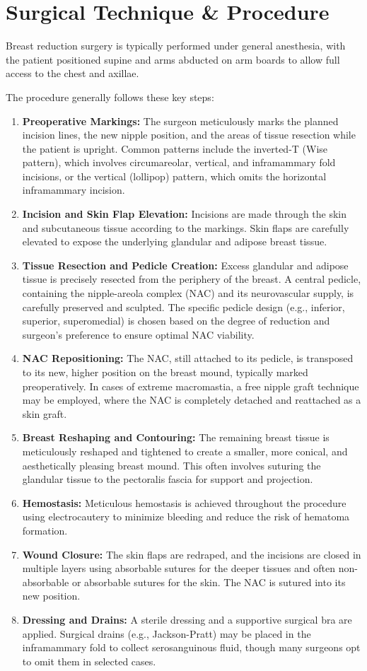 \section*{Surgical Technique \& Procedure}
Breast reduction surgery is typically performed under general anesthesia, with the patient positioned supine and arms abducted on arm boards to allow full access to the chest and axillae.

The procedure generally follows these key steps:
\begin{enumerate}
  \item \textbf{Preoperative Markings:} The surgeon meticulously marks the planned incision lines, the new nipple position, and the areas of tissue resection while the patient is upright. Common patterns include the inverted-T (Wise pattern), which involves circumareolar, vertical, and inframammary fold incisions, or the vertical (lollipop) pattern, which omits the horizontal inframammary incision.
  \item \textbf{Incision and Skin Flap Elevation:} Incisions are made through the skin and subcutaneous tissue according to the markings. Skin flaps are carefully elevated to expose the underlying glandular and adipose breast tissue.
  \item \textbf{Tissue Resection and Pedicle Creation:} Excess glandular and adipose tissue is precisely resected from the periphery of the breast. A central pedicle, containing the nipple-areola complex (NAC) and its neurovascular supply, is carefully preserved and sculpted. The specific pedicle design (e.g., inferior, superior, superomedial) is chosen based on the degree of reduction and surgeon's preference to ensure optimal NAC viability.
  \item \textbf{NAC Repositioning:} The NAC, still attached to its pedicle, is transposed to its new, higher position on the breast mound, typically marked preoperatively. In cases of extreme macromastia, a free nipple graft technique may be employed, where the NAC is completely detached and reattached as a skin graft.
  \item \textbf{Breast Reshaping and Contouring:} The remaining breast tissue is meticulously reshaped and tightened to create a smaller, more conical, and aesthetically pleasing breast mound. This often involves suturing the glandular tissue to the pectoralis fascia for support and projection.
  \item \textbf{Hemostasis:} Meticulous hemostasis is achieved throughout the procedure using electrocautery to minimize bleeding and reduce the risk of hematoma formation.
  \item \textbf{Wound Closure:} The skin flaps are redraped, and the incisions are closed in multiple layers using absorbable sutures for the deeper tissues and often non-absorbable or absorbable sutures for the skin. The NAC is sutured into its new position.
  \item \textbf{Dressing and Drains:} A sterile dressing and a supportive surgical bra are applied. Surgical drains (e.g., Jackson-Pratt) may be placed in the inframammary fold to collect serosanguinous fluid, though many surgeons opt to omit them in selected cases.
\end{enumerate}
